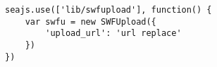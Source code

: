 
\lstset{language=c}

\begin{lstlisting}[frame=single]
seajs.use(['lib/swfupload'], function() {
	var swfu = new SWFUpload({
		'upload_url': 'url replace'
	})
})
\end{lstlisting}